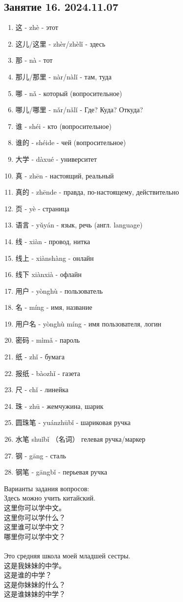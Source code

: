 \LARGE
\subsection{Занятие 16. 2024.11.07}
\begin{newwords}
	\begin{enumerate}\hfill
	\item 这 - zhè - этот
	\item 这儿/这里 - zhèr/zhèlǐ - здесь
	\item 那 - nà - тот
	\item 那儿/那里 - nàr/nàlǐ - там, туда
	\item 哪 - nǎ - который (вопросительное)
	\item 哪儿/哪里 - nǎr/nǎlǐ - Где? Куда? Откуда?
	\item 谁 - shéi - кто (вопросительное)
	\item 谁的 - shéide - чей (вопросительное)
	\item 大学 - dàxué - университет
	\item 真 - zhēn - настоящий, реальный
	\item 真的 - zhēnde - правда, по-настоящему, действительно
	\item 页 - yè - страница
	\item 语言 - yǔyán - язык, речь (англ. language)
	\item 线 - xiàn - провод, нитка
	\item 线上 - xiànshàng - онлайн
	\item 线下 xiànxià - офлайн
	\item 用户 - yònghù - пользователь
	\item 名 - míng - имя, название
	\item 用户名 - yònghù míng - имя пользователя, логин
	\item 密码 - mìmǎ - пароль 
	\item 纸 - zhǐ - бумага
	\item 报纸 - bàozhǐ - газета
	\item 尺 - chǐ - линейка
	\item 珠 - zhū - жемчужина, шарик
	\item 圆珠笔 - yuánzhūbǐ - шариковая ручка
	\item 水笔 shuǐbǐ （名词） гелевая ручка/маркер
	\item 钢 - gāng - сталь
	\item 钢笔 - gāngbǐ - перьевая ручка
	\end{enumerate}
\end{newwords}
Варианты задания вопросов:\\
Здесь можно учить китайский.\\
这里你可以学中文。\\
这里你可以学什么？\\
这里谁可以学中文？\\
哪里你可以学中文？\\
\\
Это средняя школа моей младшей сестры.\\
这是我妹妹的中学。\\
这是谁的中学？\\
这是你妹妹的什么？\\
这是谁妹妹的中学？\\
